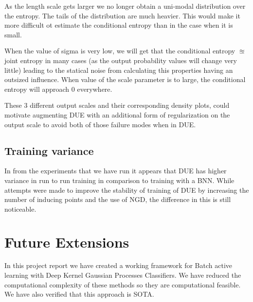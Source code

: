 \documentclass[12pt, a4paper]{report}
\theoremstyle{definition}
\theoremstyle{definition}
\theoremstyle{definition}
\begin{document}
As the length scale gets larger we no longer obtain a uni-modal distribution over the entropy. The tails of the distribution are much heavier. This would make it more difficult ot estimate the conditional entropy than in the case when it is small. 

When the value of sigma is very low, we will get that the conditional entropy $\approxeq$ joint entropy in many cases (as the output probability values will change very little) leading to the statical noise from calculating this properties having an outsized influence. When value of the scale parameter is to large, the conditional entropy will approach $0$ everywhere.

These 3 different output scales and their corresponding density plots, could motivate augmenting DUE with an additional form of regularization on the output scale to avoid both of those failure modes when in DUE.

\subsection{Training variance}

In from the experiments that we have run it appears that DUE has higher variance in run to run training in comparison to training with a BNN. While attempts were made to improve the stability of training of DUE by increasing the number of inducing points and the use of NGD, the difference in this is still noticeable.

\section{Future Extensions}

In this project report we have created a working framework for Batch active learning with Deep Kernel Gaussian Processes Classifiers. We have reduced the computational complexity of these methods so they are computational feasible. We have also verified that this approach is SOTA.





\renewcommand{\bibname}{Bibliography}


\end{document}
